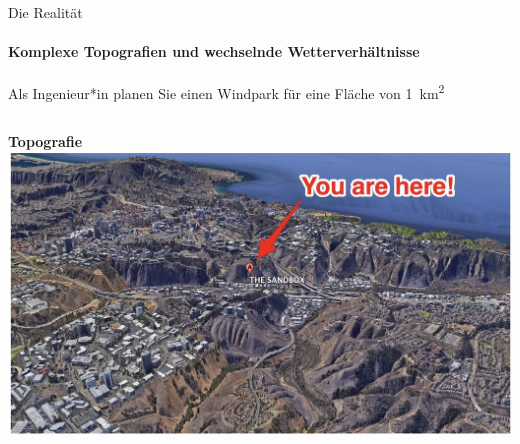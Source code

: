 \documentclass[aspectratio=169,11pt]{beamer}
\begin{document}
\begin{frame}{Die Realität}
	\framesubtitle{Komplexe Topografien und wechselnde Wetterverhältnisse}
  		Als Ingenieur*in planen Sie einen Windpark für eine Fläche von \qty{1}{\kilo\meter\squared} \\ [1em]
    \begin{columns}[T]
    	\begin{column}{0.66\textwidth}
    			\textbf{Topografie} \\
    			\includegraphics[width=1.\linewidth]{../img/you_are_here}
		\end{column}
    		

\end{columns}
\end{frame}
\end{document}
